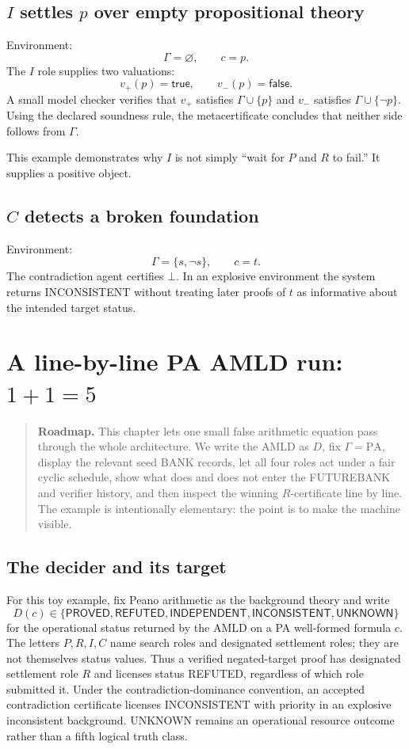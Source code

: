 \documentclass[11pt,openany]{book}
\theoremstyle{definition}
\theoremstyle{remark}
\newenvironment{roadmap}{\begin{quote}\small\color{deepblue}\textbf{Roadmap.} }{\end{quote}}
\newcommand{\botc}{\bot}
\begin{document}
\section{\texorpdfstring{$I$ settles $p$ over empty propositional theory}{I settles p over empty propositional theory}}
Environment:
\[
\Gamma=\varnothing,\qquad c=p.
\]
The $I$ role supplies two valuations:
\[
v_+(p)=\textsf{true},\qquad v_-(p)=\textsf{false}.
\]
A small model checker verifies that $v_+$ satisfies $\Gamma\cup\{p\}$ and $v_-$ satisfies $\Gamma\cup\{\neg p\}$. Using the declared soundness rule, the metacertificate concludes that neither side follows from $\Gamma$.

This example demonstrates why $I$ is not simply ``wait for $P$ and $R$ to fail.'' It supplies a positive object.

\section{\texorpdfstring{$C$ detects a broken foundation}{C detects a broken foundation}}
Environment:
\[
\Gamma=\{s,\neg s\},\qquad c=t.
\]
The contradiction agent certifies $\botc$. In an explosive environment the system returns \textsf{INCONSISTENT} without treating later proofs of $t$ as informative about the intended target status.

\chapter{A line-by-line PA AMLD run: \texorpdfstring{$1+1=5$}{1+1=5}}\label{ch:pa115}
\begin{roadmap}
This chapter lets one small false arithmetic equation pass through the whole architecture. We write the AMLD as $D$, fix $\Gamma=\mathrm{PA}$, display the relevant seed BANK records, let all four roles act under a fair cyclic schedule, show what does and does not enter the FUTUREBANK and verifier history, and then inspect the winning $R$-certificate line by line. The example is intentionally elementary: the point is to make the machine visible.
\end{roadmap}

\section{The decider and its target}
For this toy example, fix Peano arithmetic as the background theory and write
\[
D(c)\in\{\textsf{PROVED},\textsf{REFUTED},\textsf{INDEPENDENT},\textsf{INCONSISTENT},\textsf{UNKNOWN}\}
\]
for the operational status returned by the AMLD on a PA well-formed formula $c$. The letters $P,R,I,C$ name search roles and designated settlement roles; they are not themselves status values. Thus a verified negated-target proof has designated settlement role $R$ and licenses status \textsf{REFUTED}, regardless of which role submitted it. Under the contradiction-dominance convention, an accepted contradiction certificate licenses \textsf{INCONSISTENT} with priority in an explosive inconsistent background. \textsf{UNKNOWN} remains an operational resource outcome rather than a fifth logical truth class.
\end{document}
